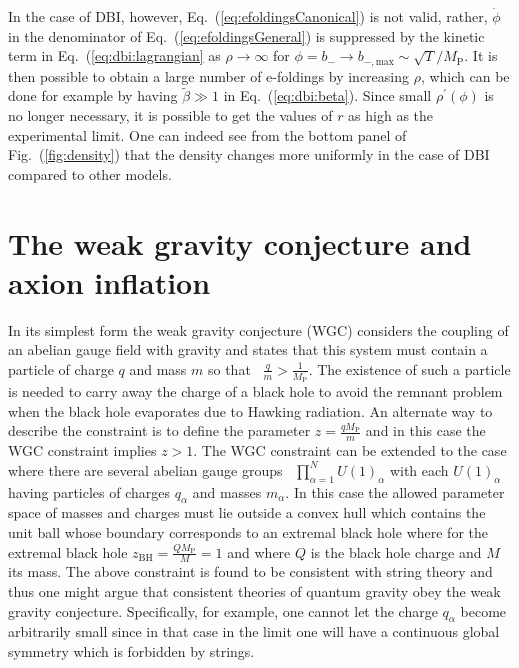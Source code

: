 \documentclass[12pt]{article}
\begin{document}
In the case of DBI, however, Eq.~(\ref{eq:efoldingsCanonical}) is not valid, rather, $\dot\phi$ in the denominator of Eq.~(\ref{eq:efoldingsGeneral}) is suppressed by the kinetic term in Eq.~(\ref{eq:dbi:lagrangian} as $\rho \rightarrow \infty$ for $\phi = b_- \rightarrow b_{-, \text{max}} \sim \sqrt{T} / M_\text{P}$.
It is then possible to obtain a large number of e-foldings by increasing $\rho$, which can be done for example by having $\tilde\beta \gg 1$ in Eq.~(\ref{eq:dbi:beta}).
Since small $\rho^\prime\left(\phi\right)$ is no longer necessary, it is possible to get the values of $r$ as high as the experimental limit.
One can indeed see from the bottom panel of Fig.~(\ref{fig:density}) that the density changes more uniformly in the case of DBI compared to other models.

\section{The weak gravity conjecture and axion inflation \label{sec:WeakGravityConjecture}}
In its simplest form the weak gravity conjecture (WGC) considers the coupling of an abelian gauge field with gravity and states that this system must contain a particle of charge $q$ and mass $m$ so that~\cite{ArkaniHamed:2006dz} $\frac{q}{m} > \frac{1}{M_\text{P}}$.
The existence of such a particle is needed to carry away the charge of a black hole to avoid the remnant problem when the black hole evaporates due to Hawking radiation.
An alternate way to describe the constraint is to define the parameter $z = \frac{q M_\text{P}}{m}$ and in this case the WGC constraint implies $z > 1$.
The WGC constraint can be extended to the case where there are several abelian gauge groups~\cite{Cheung:2014vva} $\prod_{\alpha = 1}^N U\left(1\right)_\alpha$ with each $U\left(1\right)_\alpha$ having particles of charges $q_\alpha$ and masses $m_\alpha$.
In this case the allowed parameter space of masses and charges must lie outside a convex hull which contains the unit ball whose boundary corresponds to an extremal black hole where for the extremal black hole $z_\text{BH} = \frac{Q M_\text{P}}{M} = 1$ and where $Q$ is the black hole charge and $M$ its mass.
The above constraint is found to be consistent with string theory and thus one might argue that consistent theories of quantum gravity obey the weak gravity conjecture.
Specifically, for example, one cannot let the charge $q_\alpha$ become arbitrarily small since in that case in the limit one will have a continuous global symmetry which is forbidden by strings.
\end{document}
